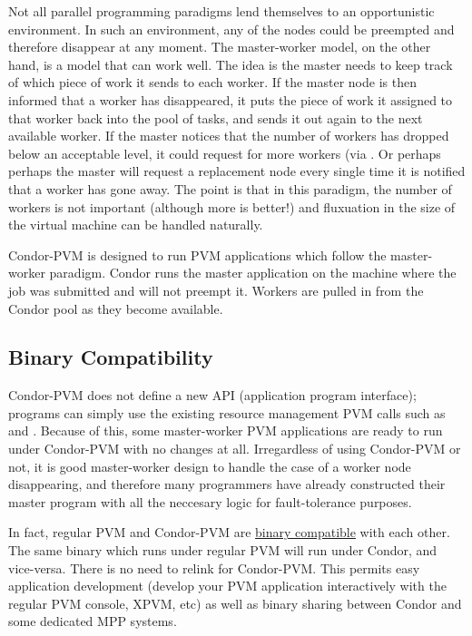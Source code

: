 Not all parallel programming paradigms lend themselves to an
opportunistic environment. In such an environment, any of the nodes
could be preempted and therefore disappear at any moment. The
master-worker model, on the other hand, is a model that can work well.
The idea is the master needs to keep track of which piece of work it
sends to each worker. If the master node is then informed that a worker
has disappeared, it puts the piece of work it assigned to that worker
back into the pool of tasks, and sends it out again to the next
available worker. If the master notices that the number of workers has
dropped below an acceptable level, it could request for more workers
(via . Or perhaps perhaps the master will request
a replacement node every single time it is notified that a worker has
gone away. The point is that in this paradigm, the number of workers is
not important (although more is better!) and fluxuation in the size of
the virtual machine can be handled naturally.

Condor-PVM is designed to run PVM applications which follow the
master-worker paradigm.  Condor runs the master application on the
machine where the job was submitted and will not preempt it.  Workers
are pulled in from the Condor pool as they become available.

\subsection{Binary Compatibility}

Condor-PVM does not define a new API (application program interface);
programs can simply use the existing resource management PVM calls such
as  and .  Because of this, some
master-worker PVM applications are ready to run under Condor-PVM with no
changes at all.  Irregardless of using Condor-PVM or not, it is good
master-worker design to handle the case of a worker node disappearing,
and therefore many programmers have already constructed their master program
with all the neccesary logic for fault-tolerance purposes.  

In fact, regular PVM and Condor-PVM are \underline{binary compatible}
with each other.  The same binary which runs under regular PVM will run
under Condor, and vice-versa.  There is no need to relink for Condor-PVM.
This permits easy application development
(develop your PVM application interactively with the regular PVM console, XPVM,
etc) as well as binary sharing between Condor and some dedicated MPP systems.

